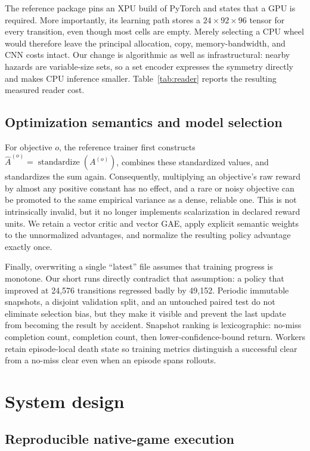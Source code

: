 \documentclass[10pt]{article}
\begin{document}
The reference package pins an XPU build of PyTorch and states that a GPU is
required.  More importantly, its learning path stores a
$24\times92\times96$ tensor for every transition, even though most cells are
empty.  Merely selecting a CPU wheel would therefore leave the principal
allocation, copy, memory-bandwidth, and CNN costs intact.  Our change is
algorithmic as well as infrastructural: nearby hazards are variable-size sets,
so a set encoder expresses the symmetry directly and makes CPU inference
smaller.  Table~\ref{tab:reader} reports the resulting measured reader cost.

\subsection{Optimization semantics and model selection}

For objective $o$, the reference trainer first constructs
$\widehat{A}^{(o)}=\operatorname{standardize}(A^{(o)})$, combines these
standardized values, and standardizes the sum again.  Consequently, multiplying
an objective's raw reward by almost any positive constant has no effect, and a
rare or noisy objective can be promoted to the same empirical variance as a
dense, reliable one.  This is not intrinsically invalid, but it no longer
implements scalarization in declared reward units.  We retain a vector critic
and vector GAE, apply explicit semantic weights to the unnormalized advantages,
and normalize the resulting policy advantage exactly once.

Finally, overwriting a single ``latest'' file assumes that training progress is
monotone.  Our short runs directly contradict that assumption: a policy that
improved at 24,576 transitions regressed badly by 49,152.  Periodic immutable
snapshots, a disjoint validation split, and an untouched paired test do not
eliminate selection bias, but they make it visible and prevent the last update
from becoming the result by accident.  Snapshot ranking is lexicographic:
no-miss completion count, completion count, then lower-confidence-bound return.
Workers retain episode-local death state so training metrics distinguish a
successful clear from a no-miss clear even when an episode spans rollouts.

\section{System design}

\subsection{Reproducible native-game execution}
\end{document}
